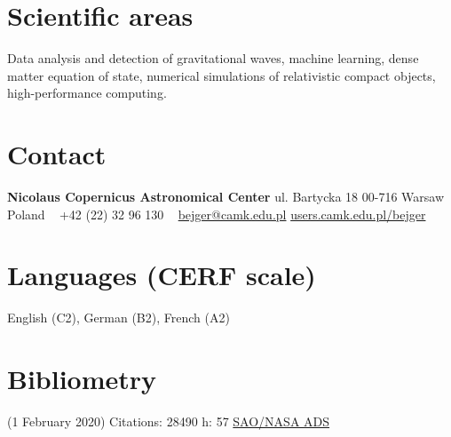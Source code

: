 \documentclass[]{friggeri-cv} %
\begin{document}


\begin{aside} %
\section{Scientific areas} 
Data analysis and detection of gravitational waves, machine learning, dense matter equation of state, numerical simulations of relativistic compact objects, high-performance computing.   
~
\section{Contact}
{\bf Nicolaus Copernicus Astronomical Center} 
ul. Bartycka 18
00-716 Warsaw 
Poland
~
+42 (22) 32 96 130
~
\href{mailto:bejger@camk.edu.pl}{bejger@camk.edu.pl}
\href{http://users.camk.edu.pl/bejger}{users.camk.edu.pl/bejger}
~
\section{Languages {\small (CERF scale)}}
English (C2), German (B2), French (A2)
\section{Bibliometry} 
{\small (1 February 2020)}
Citations: 28490
h: 57
\href{https://ui.adsabs.harvard.edu/search/q=author\%3A\%22Bejger\%2C\%20M.\%22&sort=date\%20desc\%2C\%20bibcode\%20desc&p_=0}{SAO/NASA ADS}
\end{aside}
\end{document}
